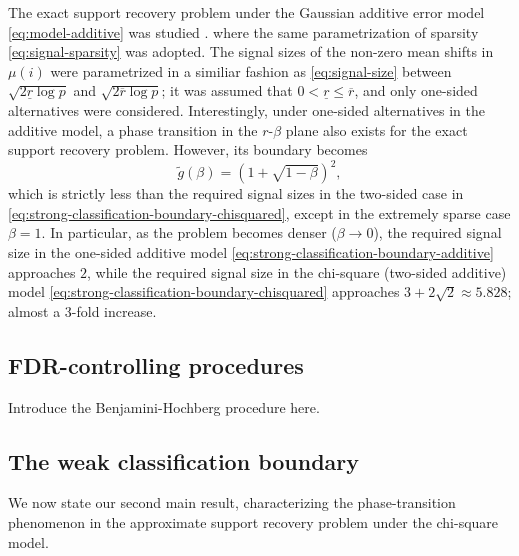 \begin{remark}
The exact support recovery problem under the Gaussian additive error model \eqref{eq:model-additive} was studied \cite{gao2018fundamental}.
where the same parametrization of sparsity \eqref{eq:signal-sparsity} was adopted. 
The signal sizes of the non-zero mean shifts in $\mu(i)$ were parametrized in a similiar fashion as \eqref{eq:signal-size} between $\sqrt{2\underline{r}\log{p}}$ and $\sqrt{2\overline{r}\log{p}}$;
it was assumed that $0<\underline{r}\le\overline{r}$, and only one-sided alternatives were considered.
Interestingly, under one-sided alternatives in the additive model, a phase transition in the $r$-$\beta$ plane also exists for the exact support recovery problem.
However, its boundary becomes
\begin{equation} \label{eq:strong-classification-boundary-additive}
    \widetilde{g}(\beta) = \left(1 + \sqrt{1-\beta}\right)^2,
\end{equation}
which is strictly less than the required signal sizes in the two-sided case in \eqref{eq:strong-classification-boundary-chisquared}, except in the extremely sparse case $\beta = 1$.
In particular, as the problem becomes denser ($\beta\to0$), the required signal size in the one-sided additive model \eqref{eq:strong-classification-boundary-additive} approaches $2$, while the required signal size in the chi-square (two-sided additive) model \eqref{eq:strong-classification-boundary-chisquared} approaches $3+2\sqrt{2} \approx 5.828$; almost a 3-fold increase.
\end{remark}


\subsection{FDR-controlling procedures}
\label{subsec:FDR-controlling-procedures}

Introduce the Benjamini-Hochberg procedure here.

\subsection{The weak classification boundary}
\label{subsec:weak-classification-boundary}

We now state our second main result, characterizing the phase-transition phenomenon in the approximate support recovery problem under the chi-square model.

